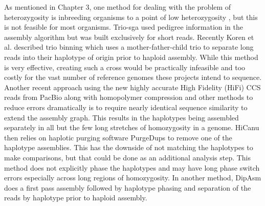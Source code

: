 \par{
As mentioned in Chapter 3, one method for dealing with the problem of heterozygosity is inbreeding organisms to a point of low heterozygosity \cite{drosophila}, 
but this is not feasible for most organisms. Trio-sga used pedigree information in the assembly algorithm \cite{trio-sga} 
but was built exclusively for short reads. Recently Koren et al. described trio binning which uses a mother-father-child trio to 
separate long reads into their haplotype of origin prior to haploid assembly\cite{triobinning}. 
While this method is very effective, creating such a cross would be practically infeasible and too costly for the vast number of reference genomes these projects intend to sequence. 
Another recent approach using the new highly accurate High Fidelity (HiFi) CCS reads from PacBio along with homopolymer compression and other methods to reduce errors dramatically is to 
require nearly identical sequence similarity to extend the assembly graph\cite{HICANU}. This results in the haplotypes being assembled separately in all but the few long stretches of homozygosity in 
a genome. HiCanu then relies on haplotic purging software PurgeDups\cite{purgedups} to remove one of the haplotype assemblies. This has the downside of not matching the haplotypes to make comparisons, but that could be done as an additional analysis step. This method does not explicitly phase the haplotypes and may have long phase switch errors especially across long regions of homozygosity. In another method, DipAsm does a first pass assembly followed by haplotype phasing and separation of the reads by haplotype prior to haploid assembly\cite{Garg2021}.
} 

